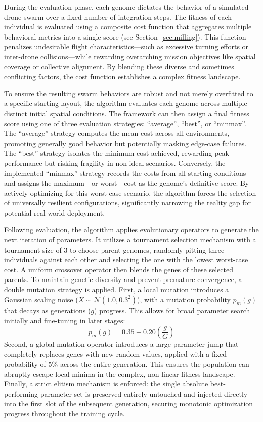 \documentclass[conference]{IEEEtran}
\begin{document}
During the evaluation phase, each genome dictates the behavior of a simulated drone swarm over a fixed number of integration steps. The fitness of each individual is evaluated using a composite cost function that aggregates multiple behavioral metrics into a single score (see Section~\ref{sec:milling}). This function penalizes undesirable flight characteristics---such as excessive turning efforts or inter-drone collisions---while rewarding overarching mission objectives like spatial coverage or collective alignment. By blending these diverse and sometimes conflicting factors, the cost function establishes a complex fitness landscape.

To ensure the resulting swarm behaviors are robust and not merely overfitted to a specific starting layout, the algorithm evaluates each genome across multiple distinct initial spatial conditions. The framework can then assign a final fitness score using one of three evaluation strategies: ``average'', ``best'', or ``minmax''. The ``average'' strategy computes the mean cost across all environments, promoting generally good behavior but potentially masking edge-case failures. The ``best'' strategy isolates the minimum cost achieved, rewarding peak performance but risking fragility in non-ideal scenarios. Conversely, the implemented ``minmax'' strategy records the costs from all starting conditions and assigns the maximum---or worst---cost as the genome's definitive score. By actively optimizing for this worst-case scenario, the algorithm forces the selection of universally resilient configurations, significantly narrowing the reality gap for potential real-world deployment.

Following evaluation, the algorithm applies evolutionary operators to generate the next iteration of parameters. It utilizes a tournament selection mechanism with a tournament size of 3 to choose parent genomes, randomly pitting three individuals against each other and selecting the one with the lowest worst-case cost. A uniform crossover operator then blends the genes of these selected parents. To maintain genetic diversity and prevent premature convergence, a double mutation strategy is applied. First, a local mutation introduces a Gaussian scaling noise ($X \sim \mathcal{N}(1.0, 0.3^2)$), with a mutation probability $p_m(g)$ that decays as generations ($g$) progress. This allows for broad parameter search initially and fine-tuning in later stages:
\begin{equation}
    p_m(g) = 0.35 - 0.20 \left( \frac{g}{G} \right)
\end{equation}
Second, a global mutation operator introduces a large parameter jump that completely replaces genes with new random values, applied with a fixed probability of 5\% across the entire generation. This ensures the population can abruptly escape local minima in the complex, non-linear fitness landscape. Finally, a strict elitism mechanism is enforced: the single absolute best-performing parameter set is preserved entirely untouched and injected directly into the first slot of the subsequent generation, securing monotonic optimization progress throughout the training cycle.
\end{document}
